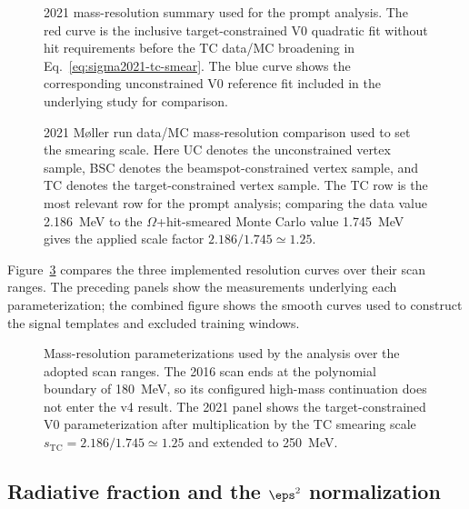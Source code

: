 \begin{figure}[H]
\centering
{}
\caption{2021 mass-resolution summary used for the prompt analysis. The red curve is
the inclusive target-constrained V0 quadratic fit without hit requirements before the
TC data/MC broadening in Eq.~\ref{eq:sigma2021-tc-smear}. The blue curve shows the
corresponding unconstrained V0 reference fit included in the underlying study for
comparison.}
\label{fig:2021-resolution}
\end{figure}

\begin{figure}[H]
\centering
{}
\caption{2021 M{\o}ller run data/MC mass-resolution comparison used to set the
smearing scale.
Here UC denotes the unconstrained vertex sample, BSC denotes the beamspot-constrained
vertex sample, and TC denotes the target-constrained vertex sample. The TC row is the
most relevant row for the prompt analysis; comparing the data value
\SI{2.186}{MeV} to the $\Omega$+hit-smeared Monte Carlo value \SI{1.745}{MeV}
gives the applied scale factor $2.186/1.745\simeq1.25$.}
\label{fig:2021-data-mc-smearing-scale}
\end{figure}

Figure~\ref{fig:mass-resolution-three-panel} compares the three implemented resolution
curves over their scan ranges. The preceding panels show the measurements underlying
each parameterization; the combined figure shows the smooth curves used to construct
the signal templates and excluded training windows.

\begin{figure}[H]
\centering
{}
\caption{Mass-resolution parameterizations used by the analysis over the adopted
scan ranges. The 2016 scan ends at the polynomial boundary of \SI{180}{MeV}, so its
configured high-mass continuation does not enter the v4 result. The 2021 panel shows the target-constrained V0 parameterization after
multiplication by the TC smearing scale $s_{\mathrm{TC}}=2.186/1.745\simeq1.25$ and
extended to \SI{250}{MeV}.}
\label{fig:mass-resolution-three-panel}
\end{figure}

\subsection{Radiative fraction and the \texorpdfstring{$\eps^2$}{epsilon2} normalization}
\label{sec:radfrac}


